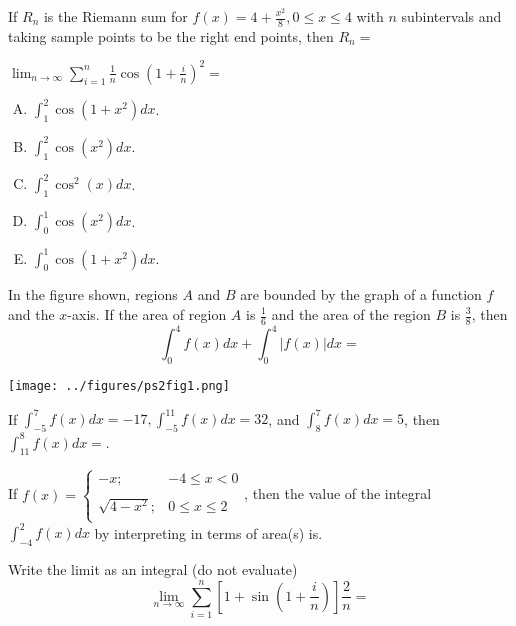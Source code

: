 \documentclass[
  course = {{MATH102 Calculus II}},
  quartile = {{2}},
  assignment = {{Section: 5.2}},
  firstexercise = 1,
  term = 203
]{../class/aga-homework}
\begin{document}
\problem  If $R_n$ is the Riemann sum for $f(x)= 4 + \frac{x^2}{8}, 0 \leq x \leq 4$
with $n$ subintervals and taking sample points to be the right end points, then $R_n =$


\newpage

\problem $\lim_{n\to \infty}\sum_{i=1}^n\frac{1}{n}\cos\left(1+\frac{i}{n}\right)^2=$

\begin{enumerate}[(A)]
  \item $\int_{1}^{2}\cos(1+x^2)dx$.
  \item $\int_{1}^{2}\cos(x^2)dx$.
  \item $\int_{1}^{2}\cos^2(x)dx$.
  \item $\int_{0}^{1}\cos(x^2)dx$.
  \item $\int_{0}^{1}\cos(1+x^2)dx$.
\end{enumerate}

\newpage


\problem
\begin{minipage}[t]{0.6\textwidth}
\vspace{0pt}
  In the figure shown, regions $A$ and $B$ are bounded by the graph of a function $f$ and the $x$-axis. If the area of region $A$ is $\frac{1}{6}$ and the area of the region $B$ is $\frac{3}{8}$, then
  \[
  \int_0^4f(x) dx + \int_{0}^{4}|f(x)| dx =
  \]
\end{minipage}
\begin{minipage}[r]{0.4\textwidth}
	\texttt{[image: ../figures/ps2fig1.png]}
\end{minipage}

\newpage


\problem If $\int_{-5}^7f(x)dx=-17, \int_{-5}^{11}f(x)dx=32$, and $\int_{8}^7f(x)dx=5$, then $\int_{11}^8f(x)dx=$.

\newpage

\problem If ${\displaystyle f(x) = \left\{\begin{array}{ll}
         -x; & -4\leq x <0 \\
         \\
         \sqrt{4-x^2}; & 0\leq x \leq 2 \\
       \end{array}\right.}$, then the value of the integral
       $ \displaystyle
       \int_{-4}^{2} f(x) dx
       $
       by interpreting in terms of area(s) is.


\newpage
\problem Write the limit as an integral (do not evaluate) \[\displaystyle \lim_{n\to \infty} \sum_{i=1}^{n}\left[1+\sin\left(1+\frac{i}{n}\right)\right]\frac{2}{n}=
\]
\end{document}
